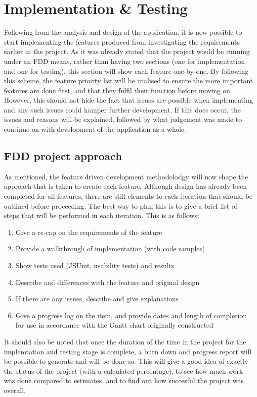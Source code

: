 \chapter{Implementation \& Testing}
Following from the analysis and design of the application, it is now possible to start implementing the features produced from investigating the requirements earlier in the project. As it was already stated that the project would be running under an FDD means, rather than having two sections (one for implementation and one for testing), this section will show each feature one-by-one. By following this scheme, the feature prioirty list will be utalised to ensure the more important features are done first, and that they fulfil their function before moving on. However, this should not hide the fact that issues are possible when implementing and any such issues could hamper further development. If this does occur, the issues and reasons will be explained, followed by what judgement was made to continue on with development of the application as a whole.

\section{FDD project approach}
As mentioned, the feature driven development methodolodgy will now shape the approach that is taken to create each feature. Although design has already been completed for all features, there are still elements to each iteration that should be outlined before proceeding. The best way to plan this is to give a brief list of steps that will be performed in each iteration. This is as follows:

\begin{enumerate}
\item Give a re-cap on the requirements of the feature
\item Provide a walkthrough of implementation (with code samples)
\item Show tests used (JSUnit, usability tests) and results
\item Describe and differences with the feature and original design
\item If there are any issues, describe and give explanations
\item Give a progress log on the item, and provide dates and length of completion for use in accordance with the Gantt chart originally constructed
\end{enumerate}

It should also be noted that once the duration of the time in the project for the implemtation and testing stage is complete, a burn down and progress report will be possible to generate and will be done so. This will give a good idea of exactly the status of the project (with a calculated percentage), to see how much work was done compared to estimates, and to find out how succesful the project was overall. 

